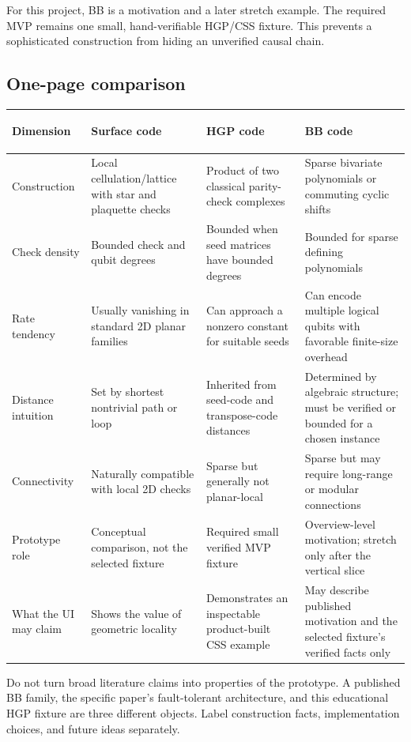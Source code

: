 \documentclass[11pt]{article}
\begin{document}
For this project, BB is a motivation and a later stretch example. The required MVP remains one
small, hand-verifiable HGP/CSS fixture. This prevents a sophisticated construction from hiding an
unverified causal chain.

\subsection{One-page comparison}

\small
\begin{longtable}{>{\bfseries\raggedright\arraybackslash}p{}
  >{\raggedright\arraybackslash}p{}
  >{\raggedright\arraybackslash}p{}
  >{\raggedright\arraybackslash}p{}}
\toprule
Dimension & Surface code & HGP code & BB code \\
\midrule
\endhead
Construction & Local cellulation/lattice with star and plaquette checks & Product of two classical
parity-check complexes & Sparse bivariate polynomials or commuting cyclic shifts \\
Check density & Bounded check and qubit degrees & Bounded when seed matrices have bounded degrees &
Bounded for sparse defining polynomials \\
Rate tendency & Usually vanishing in standard 2D planar families & Can approach a nonzero constant
for suitable seeds & Can encode multiple logical qubits with favorable finite-size overhead \\
Distance intuition & Set by shortest nontrivial path or loop & Inherited from seed-code and transpose-code
distances & Determined by algebraic structure; must be verified or bounded for a chosen instance \\
Connectivity & Naturally compatible with local 2D checks & Sparse but generally not planar-local &
Sparse but may require long-range or modular connections \\
Prototype role & Conceptual comparison, not the selected fixture & Required small verified MVP fixture &
Overview-level motivation; stretch only after the vertical slice \\
What the UI may claim & Shows the value of geometric locality & Demonstrates an inspectable product-built
CSS example & May describe published motivation and the selected fixture's verified facts only \\
\bottomrule
\end{longtable}
\normalsize

\begin{warningbox}
Do not turn broad literature claims into properties of the prototype. A published BB family, the
specific paper's fault-tolerant architecture, and this educational HGP fixture are three different
objects. Label construction facts, implementation choices, and future ideas separately.
\end{warningbox}
\end{document}
